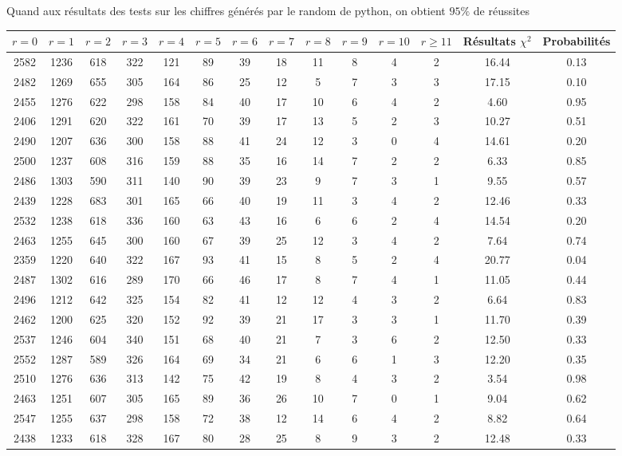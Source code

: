 \documentclass[12pt,a4paper]{article}
\begin{document}
Quand aux résultats des tests sur les chiffres générés par le random de python, on obtient $95\%$ de réussites
\begin{center}
\begin{tabular}{|c|c|c|c|c|c|c|c|c|c|c|c|c|c|}
\hline
$r = 0$ & $r = 1$ & $r = 2$ & $r = 3$ & $r = 4$ & $r = 5$ & $r = 6$ & $r = 7$ & $r = 8$ & $r = 9$ & $r = 10$ & $r \geq 11$ & Résultats $\chi^2$ & Probabilités \\ \hline
2582 & 1236 & 618 & 322 & 121 & 89 & 39 & 18 & 11 & 8 & 4 & 2 & 16.44 &  0.13\\ \hline
2482 & 1269 & 655 & 305 & 164 & 86 & 25 & 12 & 5 & 7 & 3 & 3 & 17.15 &  0.10\\ \hline
2455 & 1276 & 622 & 298 & 158 & 84 & 40 & 17 & 10 & 6 & 4 & 2 &  4.60 &  0.95\\ \hline
2406 & 1291 & 620 & 322 & 161 & 70 & 39 & 17 & 13 & 5 & 2 & 3 & 10.27 &  0.51\\ \hline
2490 & 1207 & 636 & 300 & 158 & 88 & 41 & 24 & 12 & 3 & 0 & 4 & 14.61 &  0.20\\ \hline
2500 & 1237 & 608 & 316 & 159 & 88 & 35 & 16 & 14 & 7 & 2 & 2 &  6.33 &  0.85\\ \hline
2486 & 1303 & 590 & 311 & 140 & 90 & 39 & 23 & 9 & 7 & 3 & 1 &  9.55 &  0.57\\ \hline
2439 & 1228 & 683 & 301 & 165 & 66 & 40 & 19 & 11 & 3 & 4 & 2 & 12.46 &  0.33\\ \hline
2532 & 1238 & 618 & 336 & 160 & 63 & 43 & 16 & 6 & 6 & 2 & 4 & 14.54 &  0.20\\ \hline
2463 & 1255 & 645 & 300 & 160 & 67 & 39 & 25 & 12 & 3 & 4 & 2 &  7.64 &  0.74\\ \hline
2359 & 1220 & 640 & 322 & 167 & 93 & 41 & 15 & 8 & 5 & 2 & 4 & 20.77 &  0.04\\ \hline
2487 & 1302 & 616 & 289 & 170 & 66 & 46 & 17 & 8 & 7 & 4 & 1 & 11.05 &  0.44\\ \hline
2496 & 1212 & 642 & 325 & 154 & 82 & 41 & 12 & 12 & 4 & 3 & 2 &  6.64 &  0.83\\ \hline
2462 & 1200 & 625 & 320 & 152 & 92 & 39 & 21 & 17 & 3 & 3 & 1 & 11.70 &  0.39\\ \hline
2537 & 1246 & 604 & 340 & 151 & 68 & 40 & 21 & 7 & 3 & 6 & 2 & 12.50 &  0.33\\ \hline
2552 & 1287 & 589 & 326 & 164 & 69 & 34 & 21 & 6 & 6 & 1 & 3 & 12.20 &  0.35\\ \hline
2510 & 1276 & 636 & 313 & 142 & 75 & 42 & 19 & 8 & 4 & 3 & 2 &  3.54 &  0.98\\ \hline
2463 & 1251 & 607 & 305 & 165 & 89 & 36 & 26 & 10 & 7 & 0 & 1 &  9.04 &  0.62\\ \hline
2547 & 1255 & 637 & 298 & 158 & 72 & 38 & 12 & 14 & 6 & 4 & 2 &  8.82 &  0.64\\ \hline
2438 & 1233 & 618 & 328 & 167 & 80 & 28 & 25 & 8 & 9 & 3 & 2 & 12.48 &  0.33\\ \hline
\end{tabular}
\end{center}
\end{document}
